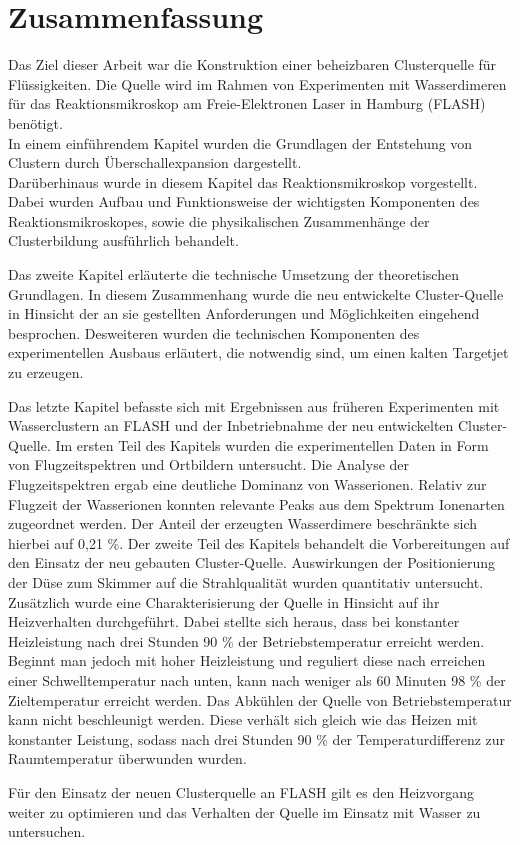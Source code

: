\chapter{Zusammenfassung} 

Das Ziel dieser Arbeit war die Konstruktion einer beheizbaren Clusterquelle für Flüssigkeiten. Die Quelle wird im Rahmen von Experimenten mit Wasserdimeren für das Reaktionsmikroskop am Freie-Elektronen Laser in Hamburg (FLASH) benötigt. \\

In einem einführendem Kapitel wurden die Grundlagen der Entstehung von Clustern durch Überschallexpansion dargestellt. \\Darüberhinaus wurde in diesem Kapitel das Reaktionsmikroskop vorgestellt. Dabei wurden Aufbau und Funktionsweise der wichtigsten Komponenten des Reaktionsmikroskopes, sowie die physikalischen Zusammenhänge der Clusterbildung ausführlich behandelt.

Das zweite Kapitel erläuterte die technische Umsetzung der theoretischen Grundlagen. In diesem Zusammenhang wurde die neu entwickelte Cluster-Quelle in Hinsicht der an sie gestellten Anforderungen und Möglichkeiten eingehend besprochen. Desweiteren wurden die technischen Komponenten des experimentellen Ausbaus erläutert, die notwendig sind, um einen kalten Targetjet zu erzeugen.

Das letzte Kapitel befasste sich mit Ergebnissen aus früheren Experimenten mit Wasserclustern an FLASH und der Inbetriebnahme der neu entwickelten Cluster-Quelle.
Im ersten Teil des Kapitels wurden die experimentellen Daten in Form von Flugzeitspektren und Ortbildern untersucht. Die Analyse der Flugzeitspektren ergab eine deutliche Dominanz von Wasserionen. Relativ zur Flugzeit der Wasserionen konnten relevante Peaks aus dem Spektrum Ionenarten zugeordnet werden. Der Anteil der erzeugten Wasserdimere beschränkte sich hierbei auf 0,21 \%.
Der zweite Teil des Kapitels behandelt die Vorbereitungen auf den Einsatz der neu gebauten Cluster-Quelle. Auswirkungen der Positionierung der Düse zum Skimmer auf die Strahlqualität wurden quantitativ untersucht. Zusätzlich wurde eine Charakterisierung der Quelle in Hinsicht auf ihr Heizverhalten durchgeführt. Dabei stellte sich heraus, dass bei konstanter Heizleistung nach drei Stunden 90 \% der Betriebstemperatur erreicht werden. Beginnt man jedoch mit hoher Heizleistung und reguliert diese nach erreichen einer Schwelltemperatur nach unten, kann nach weniger als 60 Minuten 98 \% der Zieltemperatur erreicht werden. Das Abkühlen der Quelle von Betriebstemperatur kann nicht beschleunigt werden. Diese verhält sich gleich wie das Heizen mit konstanter Leistung, sodass nach drei Stunden 90 \% der Temperaturdifferenz zur Raumtemperatur überwunden wurden. 

Für den Einsatz der neuen Clusterquelle an FLASH gilt es den Heizvorgang weiter zu optimieren und das Verhalten der Quelle im Einsatz mit Wasser zu untersuchen.

